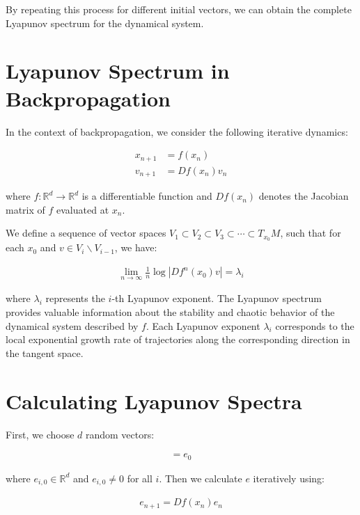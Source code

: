 \documentclass{article}
\begin{document}
By repeating this process for different initial vectors, we can obtain the complete Lyapunov spectrum for the dynamical system.

\section*{Lyapunov Spectrum in Backpropagation}

In the context of backpropagation, we consider the following iterative dynamics:

\begin{align}
    x_{n+1} &= f(x_n) \\
    v_{n+1} &= Df(x_n)v_n
\end{align}

where $f: \mathbb{R}^d \rightarrow \mathbb{R}^d$ is a differentiable function and $Df(x_n)$ denotes the Jacobian matrix of $f$ evaluated at $x_n$.

We define a sequence of vector spaces $V_1 \subset V_2 \subset V_3 \subset \cdots \subset T_{x_0}M$, such that for each $x_0$ and $v \in V_i \backslash V_{i-1}$, we have:

\begin{align}
    \lim_{n \to \infty} \frac{1}{n} \log |Df^n(x_0)v| = \lambda_i
\end{align}

where $\lambda_i$ represents the $i$-th Lyapunov exponent. The Lyapunov spectrum provides valuable information about the stability and chaotic behavior of the dynamical system described by $f$. Each Lyapunov exponent $\lambda_i$ corresponds to the local exponential growth rate of trajectories along the corresponding direction in the tangent space.

\section*{Calculating Lyapunov Spectra}

First, we choose $d$ random vectors:

\begin{align}
    [e_{1,0}, e_{2,0}, \cdots, e_{d,0}] = e_0
\end{align}

where $e_{i,0} \in \mathbb{R}^d$ and $e_{i,0} \neq 0$ for all $i$. Then we calculate $e$ iteratively using:

\begin{align}
    e_{n+1} = Df(x_n)e_{n}
\end{align}
\end{document}
